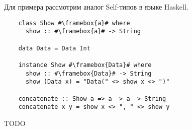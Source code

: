 Для примера рассмотрим аналог Self-типов в языке Haskell.


\begin{verbatim}
    class Show #\framebox{a}# where
      show :: #\framebox{a}# -> String

    data Data = Data Int

    instance Show #\framebox{Data}# where
      show :: #\framebox{Data}# -> String
      show (Data x) = "Data(" <> show x <> ")"

    concatenate :: Show a => a -> a -> String
    concatenate x y = show x <> ", " <> show y
\end{verbatim}

TODO %
